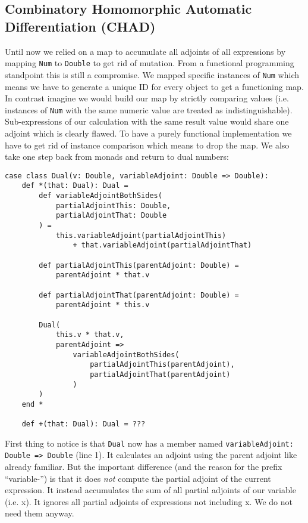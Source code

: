 \subsection{Combinatory Homomorphic Automatic Differentiation (CHAD)} \label{sec:chad}

Until now we relied on a map to accumulate all adjoints of all expressions by mapping \lstinline{Num} to \lstinline{Double} to get rid of mutation. From a functional programming standpoint this is still a compromise. We mapped specific instances of \lstinline{Num} which means we have to generate a unique ID for every object to get a functioning map. In contrast imagine we would build our map by strictly comparing values (i.e. instances of \lstinline{Num} with the same numeric value are treated as indistinguishable). Sub-expressions of our calculation with the same result value would share one adjoint which is clearly flawed. To have a purely functional implementation we have to get rid of instance comparison which means to drop the map. We also take one step back from monads and return to dual numbers:
\begin{lstlisting}
case class Dual(v: Double, variableAdjoint: Double => Double):
    def *(that: Dual): Dual =
        def variableAdjointBothSides(
            partialAdjointThis: Double, 
            partialAdjointThat: Double
        ) =
            this.variableAdjoint(partialAdjointThis) 
                + that.variableAdjoint(partialAdjointThat)

        def partialAdjointThis(parentAdjoint: Double) = 
            parentAdjoint * that.v
            
        def partialAdjointThat(parentAdjoint: Double) = 
            parentAdjoint * this.v

        Dual(
            this.v * that.v,
            parentAdjoint =>
                variableAdjointBothSides(
                    partialAdjointThis(parentAdjoint), 
                    partialAdjointThat(parentAdjoint)
                )
        )
    end *

    def +(that: Dual): Dual = ???
\end{lstlisting}
First thing to notice is that \lstinline{Dual} now has a member named \lstinline{variableAdjoint: Double => Double} (line 1). It calculates an adjoint using the parent adjoint like already familiar. But the important difference (and the reason for the prefix ``variable-'') is that it does \emph{not} compute the partial adjoint of the current expression. It instead accumulates the sum of all partial adjoints of our variable (i.e. x). It ignores all partial adjoints of expressions not including x. We do not need them anyway.

